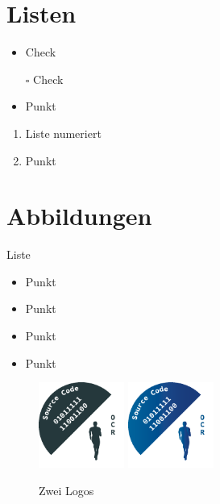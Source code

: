 \documentclass[a4paper,fontsize=14pt,DIV=calc,fleqn,parskip=half]{scrartcl}
\title{\color{blau5}{\thema}}
\author{\name}
\date{\today}
\begin{document}
	\thispagestyle{empty}
	\maketitle
	\newpage
	\setcounter{page}{1}

	\section*{Listen}%
	\begin{itemize}[label=\checkmark] %
		\item Check
	\end{itemize}

	\begin{itemize} 
		\item [$\square$] Check
	\end{itemize}

	\begin{itemize} 
		\item Punkt
	\end{itemize}
	\begin{enumerate} 
		\item Liste numeriert
		\item Punkt
	\end{enumerate}

	\newpage
	\section*{Abbildungen}%

	Liste

	\begin{itemize} 
		\item Punkt
		\item Punkt
		\item Punkt
		\item Punkt
	\end{itemize}
			
	\begin{figure}[!h]
	\centering
	{\includegraphics[width=0.25\textwidth]{images/Logo/Logo1}}
	{\includegraphics[width=0.25\textwidth]{images/Logo/Logo2}}
	\caption{Zwei Logos}\label{Logos}
	\end{figure}
\end{document}

